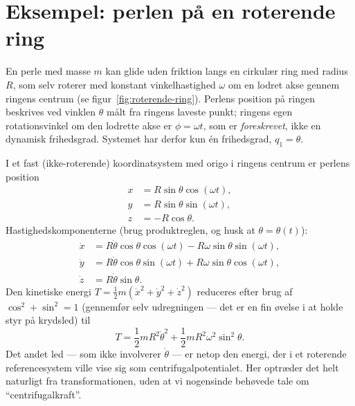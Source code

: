\section{Eksempel: perlen på en roterende ring}

\begin{eksempel}
En perle med masse $m$ kan glide uden friktion langs en cirkulær ring
med radius $R$, som selv roterer med konstant vinkelhastighed $\omega$
om en lodret akse gennem ringens centrum (se
figur~\ref{fig:roterende-ring}). Perlens position på ringen beskrives
ved vinklen $\theta$ målt fra ringens laveste punkt; ringens egen
rotationsvinkel om den lodrette akse er $\phi=\omega t$, som er
\emph{foreskrevet}, ikke en dynamisk frihedsgrad. Systemet har derfor
kun \'en frihedsgrad, $q_1=\theta$.

I et fast (ikke-roterende) koordinatsystem med origo i ringens centrum
er perlens position
\begin{align}
  x &= R\sin\theta\cos(\omega t), \\
  y &= R\sin\theta\sin(\omega t), \\
  z &= -R\cos\theta.
\end{align}
Hastighedskomponenterne (brug produktreglen, og husk at $\theta=\theta(t)$):
\begin{align}
  \dot x &= R\dot\theta\cos\theta\cos(\omega t) - R\omega\sin\theta\sin(\omega t), \\
  \dot y &= R\dot\theta\cos\theta\sin(\omega t) + R\omega\sin\theta\cos(\omega t), \\
  \dot z &= R\dot\theta\sin\theta.
\end{align}
Den kinetiske energi $T=\frac12 m(\dot x^2+\dot y^2+\dot z^2)$
reduceres efter brug af $\cos^2+\sin^2=1$ (gennemfør selv
udregningen — det er en fin øvelse i at holde styr på krydsled) til
\begin{equation}
  T = \frac12 m R^2\dot\theta^2 + \frac12 m R^2\omega^2\sin^2\theta.
\end{equation}
Det andet led — som ikke involverer $\dot\theta$ — er netop den
energi, der i et roterende referencesystem ville vise sig som
centrifugalpotentialet. Her optræder det helt naturligt fra
transformationen, uden at vi nogensinde behøvede tale om
``centrifugalkraft''.


\end{eksempel}
